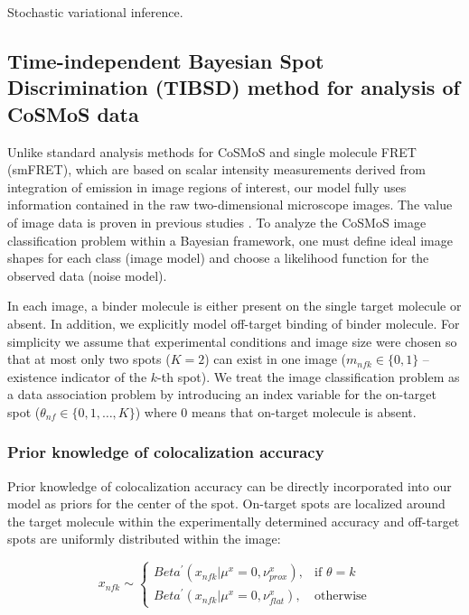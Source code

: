 Stochastic variational inference.

\subsection{Time-independent Bayesian Spot Discrimination (TIBSD) method for analysis of CoSMoS data}

Unlike standard analysis methods for CoSMoS and single molecule FRET (smFRET), which are based on scalar intensity measurements derived from integration of emission in image regions of interest, our model fully uses information contained in the raw two-dimensional microscope images. The value of image data is proven in previous studies \citep{Friedman2015-nx,Smith2019-yb}. To analyze the CoSMoS image classification problem within a Bayesian framework, one must define ideal image shapes for each class (image model) and choose a likelihood function for the observed data (noise model).

In each image, a binder molecule is either present on the single target molecule or absent. In addition, we explicitly model off-target binding of binder molecule. For simplicity  we assume that experimental conditions and image size were chosen so that at most only two spots ($K=2$) can exist in one image ($m_{nfk} \in \{ 0,1 \}$ -- existence indicator of the $k$-th spot). We treat the image classification problem as a data association problem by introducing an index variable for the on-target spot ($\theta_{nf} \in \{ 0,1,\dots,K \}$) where 0 means that on-target molecule is absent.





\subsubsection{Prior knowledge of colocalization accuracy}

Prior knowledge of colocalization accuracy can be directly incorporated into our model as priors for the center of the spot. On-target spots are localized around the target molecule within the experimentally determined accuracy and off-target spots are uniformly distributed within the image:

\begin{equation*}
    x_{nfk} \sim
\begin{cases}
    Beta^{\prime}(x_{nfk}|\mu^x=0,\nu^x_{prox}),& \text{if } \theta = k\\
    Beta^{\prime}(x_{nfk}|\mu^x=0,\nu^x_{flat}),& \text{otherwise}
\end{cases}
\end{equation*}

